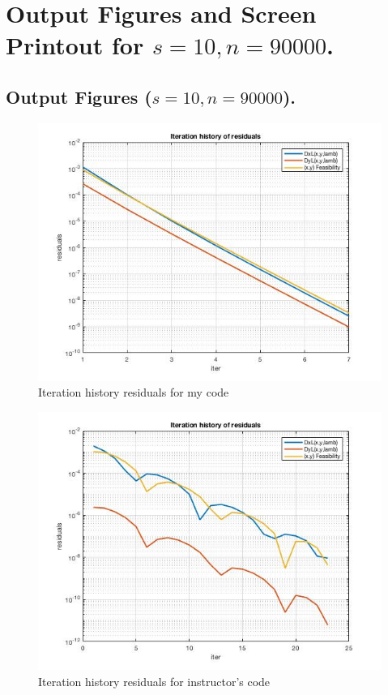\clearpage
\section{Output Figures and Screen Printout for $s=10,n=90000$.}
\subsection{Output Figures ($s=10,n=90000$).}
\begin{figure}[H]
\centering
\includegraphics[width=12cm]{F_10/F_1_2.jpg}
\caption{Iteration history residuals for my code}
\end{figure}
\begin{figure}[H]
\centering
\includegraphics[width=12cm]{F_10/F_1_3.jpg}
\caption{Iteration history residuals for instructor's code}
\end{figure}

